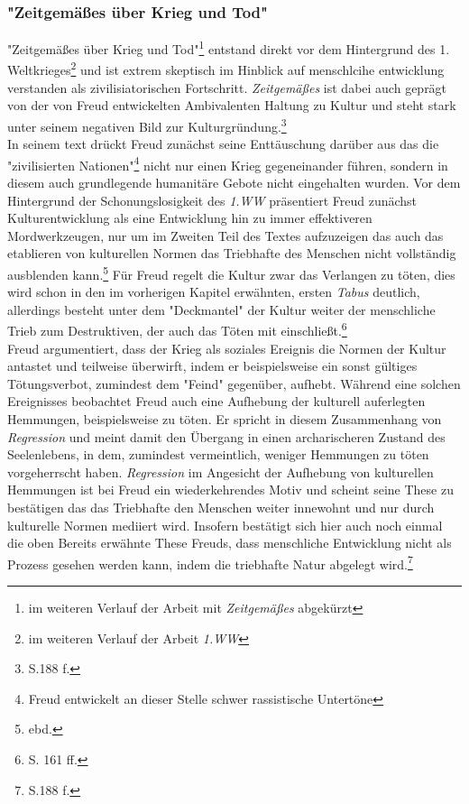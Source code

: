 \documentclass[11pt,a4paper,oneside,numbers=noenddot,bibliography=totocnumbered,DIV=13]{scrartcl}
\begin{document}
\subsubsection{"Zeitgemäßes über Krieg und Tod"}
"Zeitgemäßes über Krieg und Tod"\footnote{im weiteren Verlauf der Arbeit mit \textit{Zeitgemäßes} abgekürzt} entstand direkt vor dem Hintergrund des 1. Weltkrieges\footnote{im weiteren Verlauf der Arbeit \textit{1.WW}} und ist extrem skeptisch im Hinblick auf menschlcihe entwicklung verstanden als zivilisiatorischen Fortschritt. \textit{Zeitgemäßes} ist dabei auch geprägt von der von Freud entwickelten Ambivalenten Haltung zu Kultur und steht stark unter seinem negativen Bild zur Kulturgründung.\footnote{\cite{lohmann_freud-handbuch:_2013} S.188 f. }\\
   In seinem text drückt Freud zunächst seine Enttäuschung darüber aus das die "zivilisierten Nationen"\footnote{Freud entwickelt an dieser Stelle schwer rassistische Untertöne} nicht nur einen Krieg gegeneinander führen, sondern in diesem auch grundlegende humanitäre Gebote nicht eingehalten wurden. Vor dem Hintergrund der Schonungslosigkeit des \textit{1.WW} präsentiert Freud zunächst Kulturentwicklung als eine Entwicklung hin zu immer effektiveren Mordwerkzeugen, nur um im Zweiten Teil des Textes aufzuzeigen das auch das etablieren von kulturellen Normen das Triebhafte des Menschen nicht vollständig ausblenden kann.\footnote{ebd.}
Für Freud regelt die Kultur zwar das Verlangen zu töten, dies wird schon in den im vorherigen Kapitel erwähnten, ersten \textit{Tabus} deutlich, allerdings besteht unter dem "Deckmantel" der Kultur weiter der menschliche Trieb zum Destruktiven, der auch das Töten mit einschließt.\footnote{\cite{mccall_society--gang_2006} S. 161 ff.} \\
Freud argumentiert, dass der Krieg als soziales Ereignis die Normen der Kultur antastet und teilweise überwirft, indem er beispielsweise ein sonst gültiges Tötungsverbot, zumindest dem "Feind" gegenüber, aufhebt. Während eine solchen Ereignisses beobachtet Freud auch eine Aufhebung der kulturell auferlegten Hemmungen, beispielsweise zu töten. Er spricht in diesem Zusammenhang von \textit{Regression} und meint damit den Übergang in einen archarischeren Zustand des Seelenlebens, in dem, zumindest vermeintlich, weniger Hemmungen zu töten vorgeherrscht haben. \textit{Regression} im Angesicht der Aufhebung von kulturellen Hemmungen ist bei Freud ein wiederkehrendes Motiv und scheint seine These zu bestätigen das das Triebhafte den Menschen weiter innewohnt und nur durch kulturelle Normen mediiert wird. Insofern bestätigt sich hier auch noch einmal die oben Bereits erwähnte These Freuds, dass menschliche Entwicklung nicht als Prozess gesehen werden kann, indem die triebhafte Natur abgelegt wird.\footnote{\cite{lohmann_freud-handbuch:_2013} S.188 f.}\\
\end{document}
